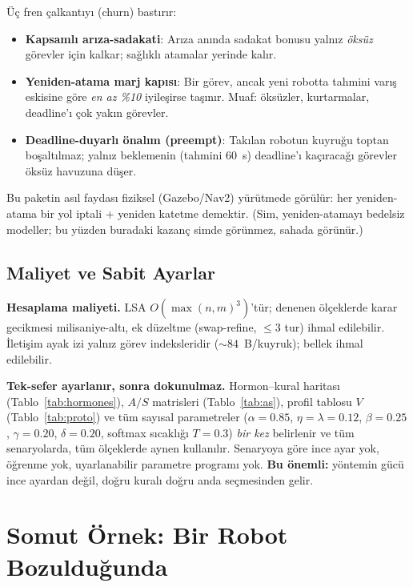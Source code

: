 \documentclass[11pt,a4paper]{article}
\begin{document}
Üç fren çalkantıyı (churn) bastırır:
\begin{itemize}
  \item \textbf{Kapsamlı arıza-sadakati}: Arıza anında sadakat bonusu yalnız
        \emph{öksüz} görevler için kalkar; sağlıklı atamalar yerinde kalır.
  \item \textbf{Yeniden-atama marj kapısı}: Bir görev, ancak yeni robotta
        tahmini varış eskisine göre \emph{en az \%10} iyileşirse taşınır.
        Muaf: öksüzler, kurtarmalar, deadline'ı çok yakın görevler.
  \item \textbf{Deadline-duyarlı önalım (preempt)}: Takılan robotun kuyruğu
        toptan boşaltılmaz; yalnız beklemenin (tahmini $60$~s) deadline'ı
        kaçıracağı görevler öksüz havuzuna düşer.
\end{itemize}
Bu paketin asıl faydası fiziksel (Gazebo/Nav2) yürütmede görülür: her
yeniden-atama bir yol iptali + yeniden katetme demektir. (Sim, yeniden-atamayı
bedelsiz modeller; bu yüzden buradaki kazanç simde görünmez, sahada görünür.)

\subsection{Maliyet ve Sabit Ayarlar}
\label{sec:complexity}

\textbf{Hesaplama maliyeti.} LSA $O(\max(n,m)^3)$'tür; denenen ölçeklerde
karar gecikmesi milisaniye-altı, ek düzeltme (swap-refine, $\le 3$ tur) ihmal
edilebilir. İletişim ayak izi yalnız görev indeksleridir ($\sim 84$~B/kuyruk);
bellek ihmal edilebilir.

\textbf{Tek-sefer ayarlanır, sonra dokunulmaz.} Hormon--kural haritası
(Tablo~\ref{tab:hormones}), $A/S$ matrisleri (Tablo~\ref{tab:as}), profil
tablosu $V$ (Tablo~\ref{tab:proto}) ve tüm sayısal parametreler
($\alpha{=}0.85$, $\eta{=}\lambda{=}0.12$, $\beta{=}0.25$, $\gamma{=}0.20$,
$\delta{=}0.20$, softmax sıcaklığı $T{=}0.3$) \emph{bir kez} belirlenir ve tüm
senaryolarda, tüm ölçeklerde aynen kullanılır. Senaryoya göre ince ayar yok,
öğrenme yok, uyarlanabilir parametre programı yok. \textbf{Bu önemli:} yöntemin
gücü ince ayardan değil, doğru kuralı doğru anda seçmesinden gelir.

\section{Somut Örnek: Bir Robot Bozulduğunda}
\label{sec:example}
\end{document}
